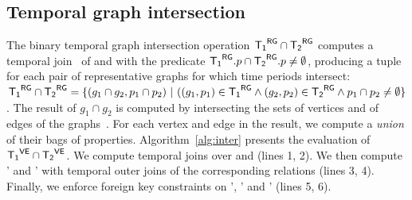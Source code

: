 

\subsection{Temporal graph intersection}
\label{sec:algebra:join}

The binary temporal graph intersection operation $\mathsf{{T_1}^{RG}} \cap \mathsf{{T_2}^{RG}}$
computes a temporal join~\cite{Gao2005} of \trga and \trgb with the
predicate $\mathsf{{T_1}^{RG}}.p \cap \mathsf{{T_2}^{RG}}.p \neq \emptyset$, producing a tuple for
each pair of representative graphs for which time periods intersect:
$\mathsf{{T_1}^{RG}} \cap \mathsf{{T_2}^{RG}} = \{(g_1 \cap g_2, p_1 \cap p_2)~|~((g_1, p_1) \in
\mathsf{{T_1}^{RG}} \wedge (g_2, p_2) \in \mathsf{{T_2}^{RG}} \wedge p_1 \cap p_2 \neq \emptyset
\}$.  The result of $g_1 \cap g_2$ is computed by intersecting the
sets of vertices and of edges of the graphs~\cite{GraphTheory}.  For
each vertex and edge in the result, we compute a {\em union} of their
bags of properties.%
%
Algorithm~\ref{alg:inter} presents the evaluation of $\mathsf{{T_1}^{VE}} \cap
\mathsf{{T_2}^{VE}}$. We compute temporal joins over \tv and \te (lines 1, 2).  We
then compute \tav' and \tae' with temporal outer joins of the
corresponding relations (lines 3, 4).  Finally, we enforce foreign key
constraints on \te', \tav' and \tae' (lines 5, 6).

